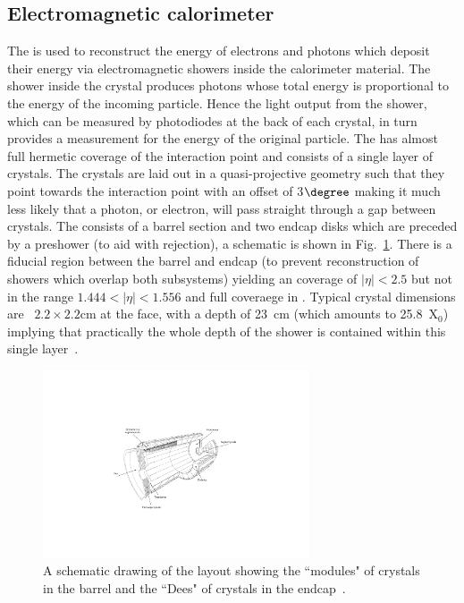 \subsection{Electromagnetic calorimeter}
\label{sec:ecal}
The \ECAL is used to reconstruct the energy of electrons and photons which deposit their energy via electromagnetic showers inside the calorimeter material. The shower inside the crystal produces photons whose total energy is proportional to the energy of the incoming particle. Hence the light output from the shower, which can be measured by photodiodes at the back of each crystal, in turn provides a measurement for the energy of the original particle. The \ECAL has almost full hermetic coverage of the interaction point and consists of a single layer of \PbWO crystals. The crystals are laid out in a quasi-projective geometry such that they point towards the interaction point with an offset of 3$\degree$ making it much less likely that a photon, or electron, will pass straight through a gap between crystals. The \ECAL consists of a barrel section and two endcap disks which are preceded by a preshower (to aid with \pizero rejection), a schematic is shown in Fig.~\ref{fig:cms_ecal}. There is a fiducial region between the barrel and endcap (to prevent reconstruction of showers which overlap both subsystems) yielding an \ECAL coverage of $|\eta|<2.5$ but not in the range $1.444<|\eta|<1.556$ and full coveraege in \phi. Typical crystal dimensions are ~$2.2\times 2.2$cm at the \ECAL face, with a depth of 23~cm (which amounts to 25.8~X$_{0}$) implying that practically the whole depth of the shower is contained within this single layer~\cite{ecal_project}. 
\begin{figure}
  \includegraphics[width=0.7\textwidth]{cms_experiment/plots/cmsecal.pdf}
  \caption[\acs{CMS} \acs{ECAL} schematic]{A schematic drawing of the \CMS \ECAL layout showing the ``modules" of crystals in the \ECAL barrel and the ``Dees" of crystals in the \ECAL endcap~\cite{CMS_JINST}.}
  \label{fig:cms_ecal}
\end{figure}

